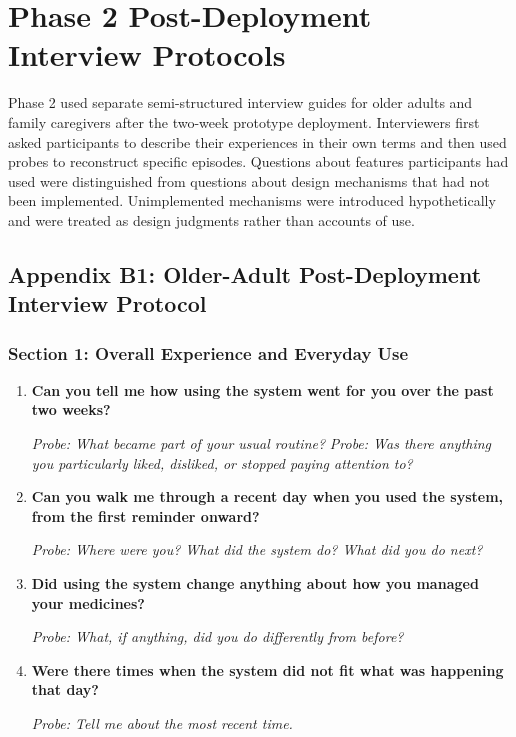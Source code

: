 \section{Phase 2 Post-Deployment Interview Protocols}

Phase 2 used separate semi-structured interview guides for older adults and family caregivers after the two-week prototype deployment. Interviewers first asked participants to describe their experiences in their own terms and then used probes to reconstruct specific episodes. Questions about features participants had used were distinguished from questions about design mechanisms that had not been implemented. Unimplemented mechanisms were introduced hypothetically and were treated as design judgments rather than accounts of use.

\subsection{Appendix B1: Older-Adult Post-Deployment Interview Protocol}

\subsubsection{Section 1: Overall Experience and Everyday Use}

\begin{enumerate}
  \item \textbf{Can you tell me how using the system went for you over the past two weeks?}

  \textit{Probe: What became part of your usual routine?} \textit{Probe: Was there anything you particularly liked, disliked, or stopped paying attention to?}
  \item \textbf{Can you walk me through a recent day when you used the system, from the first reminder onward?}

  \textit{Probe: Where were you? What did the system do? What did you do next?}
  \item \textbf{Did using the system change anything about how you managed your medicines?}

  \textit{Probe: What, if anything, did you do differently from before?}
  \item \textbf{Were there times when the system did not fit what was happening that day?}

  \textit{Probe: Tell me about the most recent time.}
\end{enumerate}

